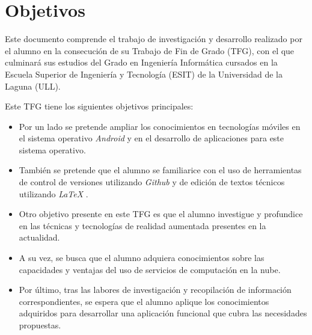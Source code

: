 %
%
%
%


\chapter{Objetivos} \label{chap:Objetivos}  

Este documento comprende el trabajo de investigación y desarrollo realizado por el alumno en la consecución de su Trabajo de Fin de Grado (TFG), con el que culminará sus estudios del Grado en Ingeniería Informática cursados en la Escuela Superior de Ingeniería y Tecnología (ESIT) de la Universidad de la Laguna (ULL).

Este TFG tiene los siguientes objetivos principales:
	
\begin{itemize}
\item Por un lado se pretende ampliar los conocimientos en tecnologías móviles en el sistema operativo \textit{Android} \cite{URL::Android} y en el desarrollo de aplicaciones para este sistema operativo.

\item También se pretende que el alumno se familiarice con el uso de herramientas de control de versiones utilizando \textit{Github} \cite{URL::Github} y de edición de textos técnicos utilizando \textit{LaTeX}  \cite{URL::LaTeX}.

\item Otro objetivo presente en este TFG es que el alumno investigue y profundice en las técnicas y tecnologías de realidad aumentada presentes en la actualidad.

\item A su vez, se busca que el alumno adquiera conocimientos sobre las capacidades y ventajas del uso de servicios de computación en la nube.

\item   Por último, tras las labores de investigación y recopilación de información correspondientes, se espera que el alumno aplique los conocimientos adquiridos para desarrollar una aplicación funcional que cubra las necesidades propuestas.
\end{itemize} 
